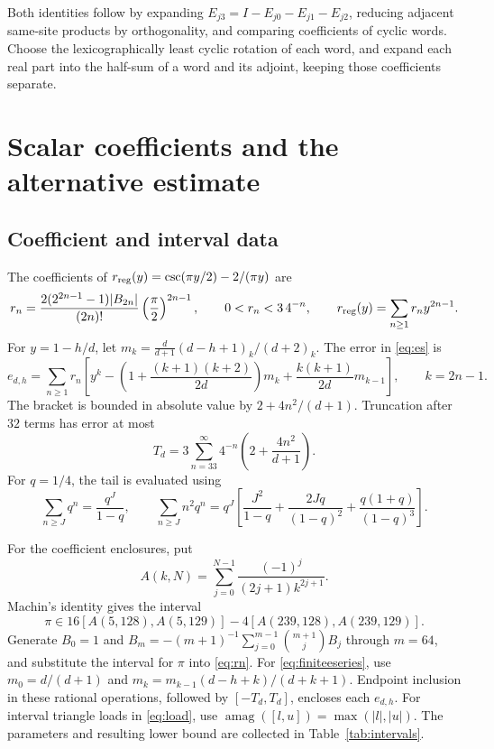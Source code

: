 \documentclass[11pt]{amsart}
\theoremstyle{remark}
\theoremstyle{plain}
\numberwithin{equation}{section}
\DeclareMathOperator{\amag}{amag}
\begin{document}
Both identities follow by expanding \(E_{j3}=I-E_{j0}-E_{j1}-E_{j2}\),
reducing adjacent same-site products by orthogonality, and comparing
coefficients of cyclic words. Choose the lexicographically least
cyclic rotation of each word, and expand each real part into the
half-sum of a word and its adjoint, keeping those coefficients
separate.

\section{Scalar coefficients and the alternative estimate}
\label{app:scalar}

\subsection{Coefficient and interval data}

The coefficients of
\(r_{\rm reg}(y)=\csc(\pi y/2)-2/(\pi y)\) are
\begin{equation}\label{eq:rn}
 r_n=
 \frac{2(2^{2n-1}-1)|B_{2n}|}{(2n)!}
 \left(\frac\pi2\right)^{2n-1},
 \qquad 0<r_n<3\,4^{-n},
 \qquad
 r_{\rm reg}(y)=\sum_{n\ge1}r_ny^{2n-1}.
\end{equation}
For \(y=1-h/d\), let
\(m_k=\frac d{d+1}(d-h+1)_k/(d+2)_k\).
The error in \eqref{eq:es} is
\begin{equation}\label{eq:finiteeseries}
 e_{d,h}=\sum_{n\ge1}r_n
 \left[
 y^k-\left(1+\frac{(k+1)(k+2)}{2d}\right)m_k
 +\frac{k(k+1)}{2d}m_{k-1}
 \right],\qquad k=2n-1.
\end{equation}
The bracket is bounded in absolute value by
\(2+4n^2/(d+1)\). Truncation after \(32\) terms has error at most
\begin{equation}\label{eq:finitetail}
 T_d=3\sum_{n=33}^\infty4^{-n}
           \left(2+\frac{4n^2}{d+1}\right).
\end{equation}
For \(q=1/4\), the tail is evaluated using
\[
 \sum_{n\ge J}q^n=\frac{q^J}{1-q},\qquad
 \sum_{n\ge J}n^2q^n
 =q^J\left[
 \frac{J^2}{1-q}+\frac{2Jq}{(1-q)^2}
 +\frac{q(1+q)}{(1-q)^3}
 \right].
\]

For the coefficient enclosures, put
\[
 A(k,N)=\sum_{j=0}^{N-1}\frac{(-1)^j}{(2j+1)k^{2j+1}}.
\]
Machin's identity gives the interval
\[
 \pi\in16[A(5,128),A(5,129)]
       -4[A(239,128),A(239,129)].
\]
Generate \(B_0=1\) and
\(B_m=-(m+1)^{-1}\sum_{j=0}^{m-1}\binom{m+1}{j}B_j\)
through \(m=64\), and substitute the interval for \(\pi\) into
\eqref{eq:rn}.
For \eqref{eq:finiteeseries}, use
\(m_0=d/(d+1)\) and
\(m_k=m_{k-1}(d-h+k)/(d+k+1)\).
Endpoint inclusion in these rational operations, followed by
\([-T_d,T_d]\), encloses each \(e_{d,h}\).
For interval triangle loads in \eqref{eq:load}, use
\(\amag([l,u])=\max(|l|,|u|)\).
The parameters and resulting lower bound are collected in
Table~\ref{tab:intervals}.
\end{document}
